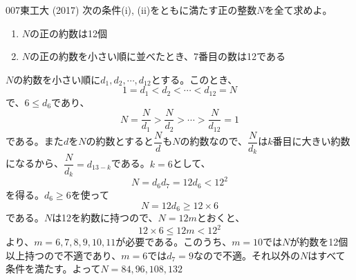 \begin{prob}{007}{}{東工大 (2017)}
 次の条件(i), (ii)をともに満たす正の整数$N$を全て求めよ。
 \begin{enumerate}[label=\roman*,align=CenterWithParen]
  \item $N$の正の約数は12個
  \item $N$の正の約数を小さい順に並べたとき、7番目の数は12である
 \end{enumerate}
\end{prob}
$N$の約数を小さい順に$d_1, d_2,\cdots, d_{12}$とする。このとき、
\[ 1=d_1<d_2<\cdots<d_{12}=N \]
で、$6\leq d_6$であり、
\[ N=\frac{N}{d_1}>\frac{N}{d_2}>\cdots>\frac{N}{d_{12}}=1 \]
である。また$d$を$N$の約数とすると$\dfrac{N}{d}$も$N$の約数なので、$\dfrac{N}{d_k}$は$k$番目に大きい約数になるから、$\dfrac{N}{d_k}=d_{13-k}$である。$k=6$として、
\[ N=d_6d_7=12d_6<12^2 \]
を得る。$d_6\geq 6$を使って
\[ N=12d_6\geq 12\times 6 \]
である。$N$は12を約数に持つので、$N=12m$とおくと、
\[ 12\times 6\leq 12m < 12^2 \]
より、$m=6, 7, 8, 9, 10, 11$が必要である。このうち、$m=10$では$N$が約数を12個以上持つので不適であり、$m=6$では$d_7=9$なので不適。それ以外の$N$はすべて条件を満たす。よって$N=84, 96, 108, 132$